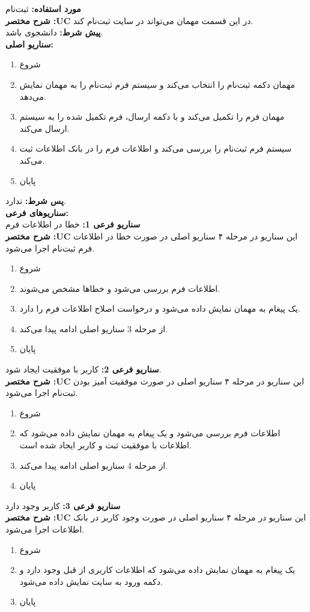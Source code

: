 
\textbf{مورد استفاده:}
ثبت‌نام
\\
\textbf{شرح مختصر :UC}
در این قسمت مهمان می‌تواند در سایت ثبت‌نام ‌کند.
\\
\textbf{پيش شرط:}
دانشجوی باشد.
\\
\textbf{سناريو اصلی:}
\begin{enumerate}
\item
شروع
\item
مهمان دکمه ثبت‌نام را انتخاب می‌کند و سیستم فرم ثبت‌نام را به مهمان نمایش می‌دهد.
\item
مهمان فرم را تکمیل می‌کند و با دکمه ارسال، فرم تکمیل شده را به سیستم ارسال می‌کند.
\item
سیستم فرم ثبت‌نام را بررسی می‌کند و اطلاعات فرم را در بانک اطلاعات ثبت می‌کند.
\item
پایان
\end{enumerate}

\noindent
\textbf{پس شرط:}
ندارد.
\\
\textbf{سناريوهای فرعی:}
\\
\textbf{سناريو فرعی 1:}
خطا در اطلاعات فرم
\\
\textbf{شرح مختصر :UC}
این سناریو در مرحله ۴ سناریو اصلی در صورت خطا در اطلاعات فرم ثبت‌نام اجرا می‌شود.
\begin{enumerate}
\item
شروع
\item
اطلاعات فرم بررسی می‌شود و خطاها مشخص می‌شوند.
\item
یک پیغام به مهمان نمایش داده می‌شود و درخواست اصلاح اطلاعات فرم را دارد.
\item
از مرحله 3 سناریو اصلی ادامه پیدا می‌کند.
\item
پایان
\end{enumerate}

\noindent
\textbf{سناريو فرعی 2:}
کاربر با موفقیت ایجاد شود.
\\
\textbf{شرح مختصر :UC}
این سناریو در مرحله ۴ سناریو اصلی در صورت موفقیت آمیز بودن ثبت‌نام اجرا می‌شود.
\begin{enumerate}
\item
شروع
\item
اطلاعات فرم بررسی می‌شود و یک پیغام به مهمان نمایش داده می‌شود که اطلاعات با موفقیت ثبت و کاربر ایجاد شده است.
\item
از مرحله 4 سناریو اصلی ادامه پیدا می‌کند.
\item
پایان
\end{enumerate}

\noindent
\textbf{سناريو فرعی 3:}
کاربر وجود دارد
\\
\textbf{شرح مختصر :UC}
این سناریو در مرحله ۴ سناریو اصلی در صورت وجود کاربر در بانک اطلاعات اجرا می‌شود.
\begin{enumerate}
\item
شروع
\item
یک پیغام به مهمان نمایش داده می‌شود که اطلاعات کاربری از قبل وجود دارد و دکمه ورود به سایت نمایش داده می‌شود.
\item
پایان
\end{enumerate}

